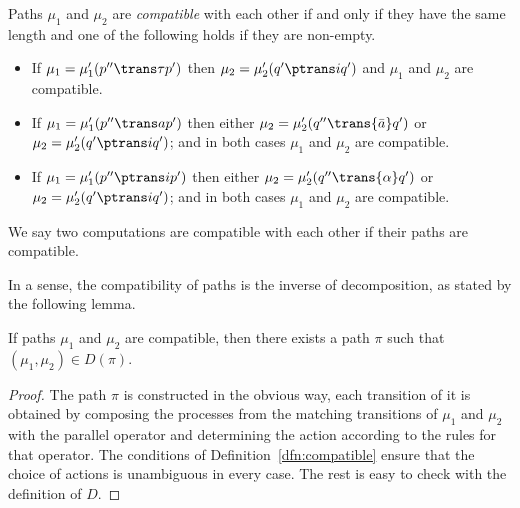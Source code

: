 \begin{definition}\label{dfn:compatible}
    Paths $\mu_1$ and $\mu_2$ are {\em compatible} with each other if and only
    if they have the same length and one of the following holds if they are non-empty.
    \begin{itemize}
        \item If $\mu_1 = \mu_1'(p'' \trans \tau p')$ then 
            $\mu_2 = \mu_2'(q' \ptrans i q')$ and 
            $\mu_1$ and $\mu_2$ are compatible.
        \item If $\mu_1 = \mu_1'(p'' \trans a p')$ then either 
            $\mu_2 = \mu_2'(q'' \trans{\bar a} q')$ or 
            $\mu_2 = \mu_2'(q' \ptrans i q')$; and in both cases
            $\mu_1$ and $\mu_2$ are compatible.
        \item If $\mu_1 = \mu_1'(p'' \ptrans i p')$ then either 
            $\mu_2 = \mu_2'(q'' \trans{\alpha} q')$ or 
            $\mu_2 = \mu_2'(q' \ptrans i q')$; and in both cases
            $\mu_1$ and $\mu_2$ are compatible.
    \end{itemize}
    We say two computations are compatible with each other if their paths
    are compatible.
\end{definition}
In a sense, the compatibility of paths is the inverse of decomposition, as stated
by the following lemma.
\begin{lemma}
    If paths $\mu_1$ and $\mu_2$ are compatible, then there exists a path $\pi$
    such that $(\mu_1,\mu_2)\in D(\pi)$.
\end{lemma}
\begin{proof}
    The path $\pi$ is constructed in the obvious way, each transition of it is
    obtained by composing the processes from the matching transitions of
    $\mu_1$ and $\mu_2$ with the parallel operator and determining
    the action according to the rules for that operator. The conditions of
    Definition~\ref{dfn:compatible} ensure that the choice of actions is
    unambiguous in every case. The rest is easy to check with the definition of $D$.
\end{proof}

